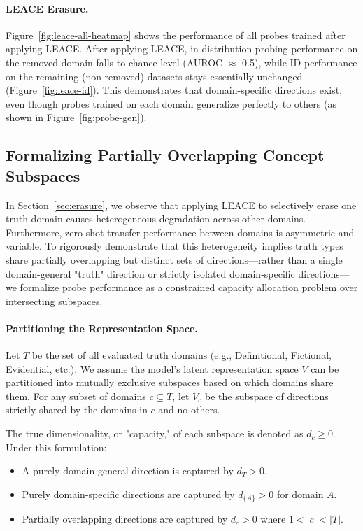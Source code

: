 \documentclass{article}
\theoremstyle{plain}
\theoremstyle{definition}
\theoremstyle{remark}
\begin{document}
\paragraph{LEACE Erasure.}
Figure~\ref{fig:leace-all-heatmap} shows the performance of all probes trained after applying LEACE. After applying LEACE, in-distribution probing performance on the removed domain falls to chance level (AUROC $\approx$ 0.5), while ID performance on the remaining (non-removed) datasets stays essentially unchanged (Figure~\ref{fig:leace-id}). This demonstrates that domain-specific directions exist, even though probes trained on each domain generalize perfectly to others (as shown in Figure~\ref{fig:probe-gen}).


\subsection{Formalizing Partially Overlapping Concept Subspaces}
\label{sec:app-add-erasure-subspaces}
In Section~\ref{sec:erasure}, we observe that applying LEACE to selectively erase one truth domain causes heterogeneous degradation across other domains. Furthermore, zero-shot transfer performance between domains is asymmetric and variable. To rigorously demonstrate that this heterogeneity implies truth types share partially overlapping but distinct sets of directions—rather than a single domain-general "truth" direction or strictly isolated domain-specific directions—we formalize probe performance as a constrained capacity allocation problem over intersecting subspaces.

\paragraph{Partitioning the Representation Space.} Let $T$ be the set of all evaluated truth domains (e.g., Definitional, Fictional, Evidential, etc.). We assume the model's latent representation space $V$ can be partitioned into mutually exclusive subspaces based on which domains share them. For any subset of domains $c \subseteq T$, let $V_c$ be the subspace of directions strictly shared by the domains in $c$ and no others.

The true dimensionality, or "capacity," of each subspace is denoted as $d_c \ge 0$. Under this formulation:
\begin{itemize}
    \item A purely domain-general direction is captured by $d_T > 0$.
    \item Purely domain-specific directions are captured by $d_{\{A\}} > 0$ for domain $A$.
    \item Partially overlapping directions are captured by $d_c > 0$ where $1 < |c| < |T|$.
\end{itemize}
\end{document}

